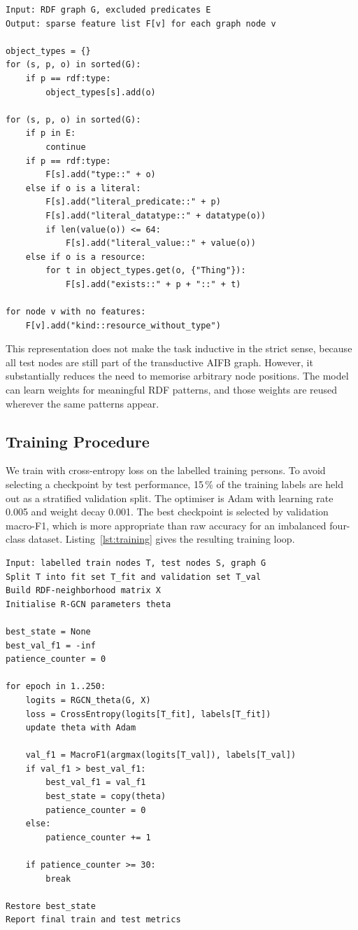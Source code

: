 \documentclass[runningheads]{llncs}
\begin{document}
\begin{lstlisting}[caption={RDF-neighbourhood feature extraction.},label={lst:features}]
Input: RDF graph G, excluded predicates E
Output: sparse feature list F[v] for each graph node v

object_types = {}
for (s, p, o) in sorted(G):
    if p == rdf:type:
        object_types[s].add(o)

for (s, p, o) in sorted(G):
    if p in E:
        continue
    if p == rdf:type:
        F[s].add("type::" + o)
    else if o is a literal:
        F[s].add("literal_predicate::" + p)
        F[s].add("literal_datatype::" + datatype(o))
        if len(value(o)) <= 64:
            F[s].add("literal_value::" + value(o))
    else if o is a resource:
        for t in object_types.get(o, {"Thing"}):
            F[s].add("exists::" + p + "::" + t)

for node v with no features:
    F[v].add("kind::resource_without_type")
\end{lstlisting}

This representation does not make the task inductive in the strict sense, because all test nodes are still
part of the transductive AIFB graph.  However, it substantially reduces the need to memorise arbitrary
node positions.  The model can learn weights for meaningful RDF patterns, and those weights are reused
wherever the same patterns appear.

\subsection{Training Procedure}

We train with cross-entropy loss on the labelled training persons.  To avoid selecting a checkpoint by
test performance, 15\,\% of the training labels are held out as a stratified validation split.  The
optimiser is Adam with learning rate 0.005 and weight decay 0.001.  The best checkpoint is selected by
validation macro-F1, which is more appropriate than raw accuracy for an imbalanced four-class dataset.
Listing~\ref{lst:training} gives the resulting training loop.

\begin{lstlisting}[caption={Training and checkpoint selection.},label={lst:training}]
Input: labelled train nodes T, test nodes S, graph G
Split T into fit set T_fit and validation set T_val
Build RDF-neighborhood matrix X
Initialise R-GCN parameters theta

best_state = None
best_val_f1 = -inf
patience_counter = 0

for epoch in 1..250:
    logits = RGCN_theta(G, X)
    loss = CrossEntropy(logits[T_fit], labels[T_fit])
    update theta with Adam

    val_f1 = MacroF1(argmax(logits[T_val]), labels[T_val])
    if val_f1 > best_val_f1:
        best_val_f1 = val_f1
        best_state = copy(theta)
        patience_counter = 0
    else:
        patience_counter += 1

    if patience_counter >= 30:
        break

Restore best_state
Report final train and test metrics
\end{lstlisting}
\end{document}

